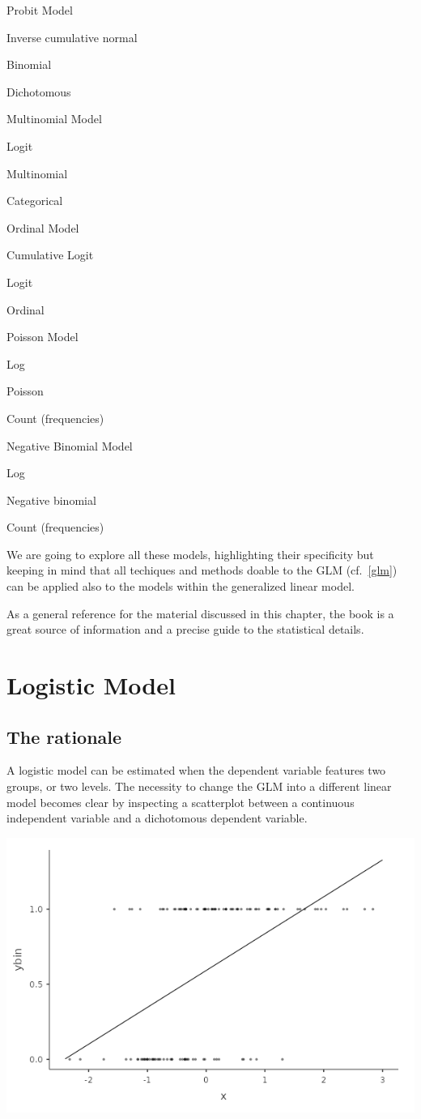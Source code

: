 \documentclass[
]{book}
\begin{document}
Probit Model

Inverse cumulative normal

Binomial

Dichotomous

Multinomial Model

Logit

Multinomial

Categorical

Ordinal Model

Cumulative Logit

Logit

Ordinal

Poisson Model

Log

Poisson

Count (frequencies)

Negative Binomial Model

Log

Negative binomial

Count (frequencies)

We are going to explore all these models, highlighting their specificity but keeping in mind that all techiques and methods doable to the GLM (cf.~\ref{glm}) can be applied also to the models within the generalized linear model.

As a general reference for the material discussed in this chapter, the book \citet{agresticategorical} is a great source of information and a precise guide to the statistical details.

\hypertarget{logistic}{%
\section{Logistic Model}\label{logistic}}

\hypertarget{the-rationale}{%
\subsection{The rationale}\label{the-rationale}}

A logistic model can be estimated when the dependent variable features two groups, or two levels. The necessity to change the GLM into a different linear model becomes clear by inspecting a scatterplot between a continuous independent variable and a dichotomous dependent variable.

\includegraphics[width=8.38in]{bookletpics/3_logistic_plot1}
\end{document}
